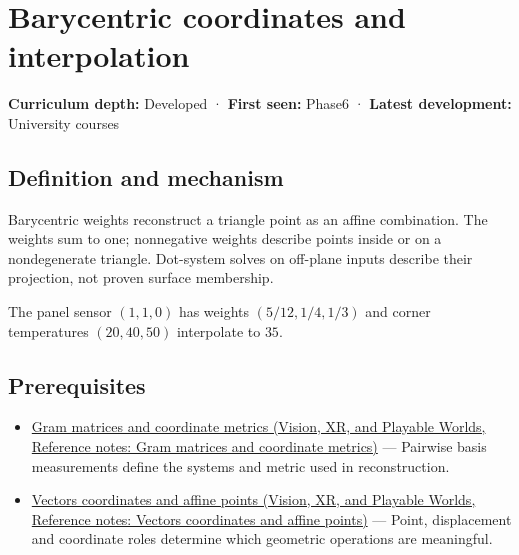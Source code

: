\hypertarget{appendix-02b9d9a81dca}{}\label{referencestart:appendix-02b9d9a81dca}
\section{Barycentric coordinates and interpolation}\label{appendix-02b9d9a81dca-barycentric-coordinates-and-interpolation}

\hypertarget{appendix-02b9d9a81dca-barycentric-coordinates-and-interpolation}{}

\textbf{Curriculum depth:} Developed · \textbf{First seen:} Phase6 · \textbf{Latest development:} University courses

\begin{allmightroledefinition}

\subsection{Definition and mechanism}\label{appendix-02b9d9a81dca-definition-and-mechanism}

\hypertarget{appendix-02b9d9a81dca-definition-and-mechanism}{}

Barycentric weights reconstruct a triangle point as an affine combination. The weights sum to one; nonnegative weights describe points inside or on a nondegenerate triangle. Dot-system solves on off-plane inputs describe their projection, not proven surface membership.

\end{allmightroledefinition}

The panel sensor \((1,1,0)\) has weights \((5/12,1/4,1/3)\) and corner temperatures \((20,40,50)\) interpolate to \(35\).

\subsection{Prerequisites}\label{appendix-02b9d9a81dca-prerequisites}

\hypertarget{appendix-02b9d9a81dca-prerequisites}{}

\begin{itemize}
\tightlist
\item
  \href{../07-Vision-XR-and-Playable-Worlds/main.pdf\#nameddest=appendix-3b863809f82a}{Gram matrices and coordinate metrics (Vision, XR, and Playable Worlds, Reference notes: Gram matrices and coordinate metrics)} --- Pairwise basis measurements define the systems and metric used in reconstruction.
\item
  \href{../07-Vision-XR-and-Playable-Worlds/main.pdf\#nameddest=appendix-0659864c0aa3}{Vectors coordinates and affine points (Vision, XR, and Playable Worlds, Reference notes: Vectors coordinates and affine points)} --- Point, displacement and coordinate roles determine which geometric operations are meaningful.
\end{itemize}

